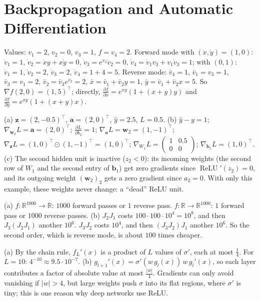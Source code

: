 \documentclass[11pt]{article}
\DeclareMathOperator{\ReLU}{ReLU}
\begin{document}
\section*{Backpropagation and Automatic Differentiation}

\begin{description}[leftmargin=0pt, itemsep=0.3em]
    \item[\ref{pr:autodiff-graph}.] Values: $v_1 = 2$, $v_2 = 0$, $v_3 = 1$, $f = v_4 = 2$. Forward mode with $(\dot x, \dot y) = (1, 0)$: $\dot v_1 = 1$, $\dot v_2 = \dot x y + x\dot y = 0$, $\dot v_3 = e^{v_2}\dot v_2 = 0$, $\dot v_4 = \dot v_1 v_3 + v_1\dot v_3 = 1$; with $(0, 1)$: $\dot v_1 = 1$, $\dot v_2 = 2$, $\dot v_3 = 2$, $\dot v_4 = 1 + 4 = 5$. Reverse mode: $\bar v_4 = 1$, $\bar v_1 = v_3 = 1$, $\bar v_3 = v_1 = 2$, $\bar v_2 = \bar v_3 e^{v_2} = 2$, $\bar x = \bar v_1 + \bar v_2 y = 1$, $\bar y = \bar v_1 + \bar v_2 x = 5$. So $\nabla f(2, 0) = (1, 5)^\top$; directly, $\frac{\partial f}{\partial x} = e^{xy}(1 + (x + y)y)$ and $\frac{\partial f}{\partial y} = e^{xy}(1 + (x + y)x)$.
    \item[\ref{pr:backprop-numbers}.] (a) $\mathbf{z} = (2, -0.5)^\top$, $\mathbf{a} = (2, 0)^\top$, $\hat y = 2.5$, $L = 0.5$. (b) $\hat y - y = 1$; $\nabla_{\mathbf{w}_2} L = \mathbf{a} = (2, 0)^\top$; $\frac{\partial L}{\partial b_2} = 1$; $\nabla_{\mathbf{a}} L = \mathbf{w}_2 = (1, -1)^\top$; $\nabla_{\mathbf{z}} L = (1, 0)^\top \odot (1, -1)^\top = (1, 0)^\top$; $\nabla_{W_1} L = \begin{pmatrix} 1 & 0.5 \\ 0 & 0 \end{pmatrix}$; $\nabla_{\mathbf{b}_1} L = (1, 0)^\top$. (c) The second hidden unit is inactive ($z_2 < 0$): its incoming weights (the second row of $W_1$ and the second entry of $\mathbf{b}_1$) get zero gradients since $\ReLU'(z_2) = 0$, and its outgoing weight $(\mathbf{w}_2)_2$ gets a zero gradient since $a_2 = 0$. With only this example, these weights never change: a ``dead'' ReLU unit.
    \item[\ref{pr:modes-cost}.] (a) $f: \mathbb{R}^{1000} \to \mathbb{R}$: $1000$ forward passes or $1$ reverse pass. $f: \mathbb{R} \to \mathbb{R}^{1000}$: $1$ forward pass or $1000$ reverse passes. (b) $J_2 J_1$ costs $100 \cdot 100 \cdot 10^4 = 10^8$, and then $J_3(J_2 J_1)$ another $10^6$. $J_3 J_2$ costs $10^4$, and then $(J_3 J_2)J_1$ another $10^6$. So the second order, which is reverse mode, is about $100$ times cheaper.
    \item[\ref{pr:vanishing}.] (a) By the chain rule, $f_L'(x)$ is a product of $L$ values of $\sigma'$, each at most $\frac{1}{4}$. For $L = 10$: $4^{-10} \approx 9.5 \cdot 10^{-7}$. (b) $g_{l+1}'(x) = \sigma'(w\,g_l(x))\,w\,g_l'(x)$, so each layer contributes a factor of absolute value at most $\frac{|w|}{4}$. Gradients can only avoid vanishing if $|w| > 4$, but large weights push $\sigma$ into its flat regions, where $\sigma'$ is tiny; this is one reason why deep networks use ReLU.
\end{description}
\end{document}
